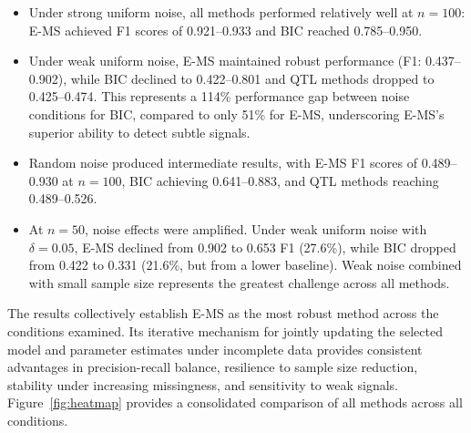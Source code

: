 \documentclass[
  12pt,
]{article}
\begin{document}

\begin{itemize}
    \item Under strong uniform noise, all methods performed 
    relatively well at $n = 100$: E-MS achieved F1 scores of 0.921--0.933 
    and BIC reached 0.785--0.950.

    \item Under weak uniform noise, E-MS maintained robust 
    performance (F1: 0.437--0.902), while BIC declined to 0.422--0.801 
    and QTL methods dropped to 0.425--0.474. This represents a 114\% 
    performance gap between noise conditions for BIC, compared to only 
    51\% for E-MS, underscoring E-MS's superior ability to detect subtle 
    signals.

    \item Random noise produced intermediate results, with E-MS 
    F1 scores of 0.489--0.930 at $n = 100$, BIC achieving 0.641--0.883, 
    and QTL methods reaching 0.489--0.526.

    \item At $n = 50$, noise effects were amplified. Under weak 
    uniform noise with $\delta = 0.05$, E-MS declined from 0.902 to 0.653 
    F1 (27.6\%), while BIC dropped from 0.422 to 0.331 (21.6\%, but from 
    a lower baseline). Weak noise combined with small sample size represents 
    the greatest challenge across all methods.
\end{itemize}


The results collectively establish E-MS as the most robust method across the conditions examined. Its iterative mechanism for jointly updating the selected model and parameter estimates under incomplete data provides consistent advantages in precision-recall balance, resilience to sample size reduction, stability under increasing missingness, and sensitivity to weak signals. Figure~\ref{fig:heatmap} provides a consolidated comparison of all methods across all conditions.

\end{document}
